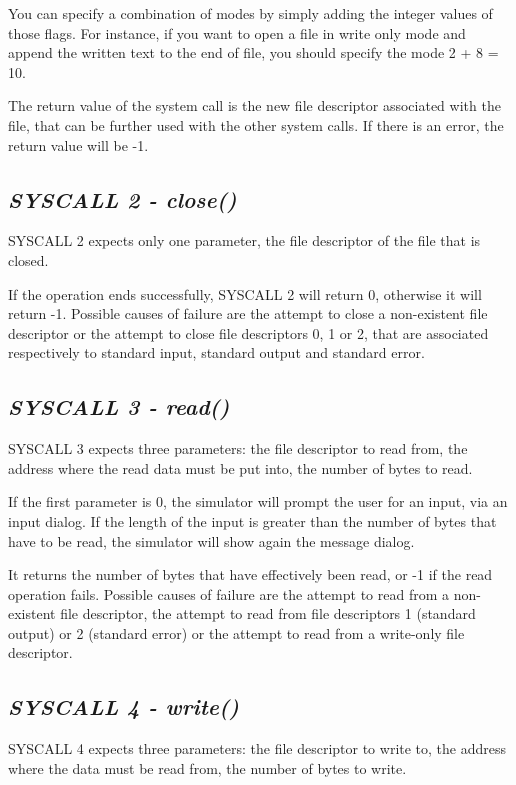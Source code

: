 \documentclass[letterpaper,10pt,english]{sphinxmanual}
\begin{document}
You can specify a combination of modes by simply adding the integer values of
those flags. For instance, if you want to open a file in write only mode and
append the written text to the end of file, you should specify the mode 2 + 8 = 10.

The return value of the system call is the new file descriptor associated with
the file, that can be further used with the other system calls. If there is an
error, the return value will be -1.


\subsection{\emph{SYSCALL 2 - close()}}
\label{instructions:syscall-2-close}
SYSCALL 2 expects only one parameter, the file descriptor of the file that is
closed.

If the operation ends successfully, SYSCALL 2 will return 0, otherwise it will
return -1. Possible causes of failure are the attempt to close a non-existent
file descriptor or the attempt to close file descriptors 0, 1 or 2, that are
associated respectively to standard input, standard output and standard error.


\subsection{\emph{SYSCALL 3 - read()}}
\label{instructions:syscall-3-read}
SYSCALL 3 expects three parameters: the file descriptor to read from, the
address where the read data must be put into, the number of bytes to read.

If the first parameter is 0, the simulator will prompt the user for an input,
via an input dialog. If the length of the input is greater than the number of
bytes that have to be read, the simulator will show again the message dialog.

It returns the number of bytes that have effectively been read, or -1 if the
read operation fails. Possible causes of failure are the attempt to read from a
non-existent file descriptor, the attempt to read from file descriptors 1
(standard output) or 2 (standard error) or the attempt to read from a write-only
file descriptor.


\subsection{\emph{SYSCALL 4 - write()}}
\label{instructions:syscall-4-write}
SYSCALL 4 expects three parameters: the file descriptor to write to, the address
where the data must be read from, the number of bytes to write.
\end{document}
